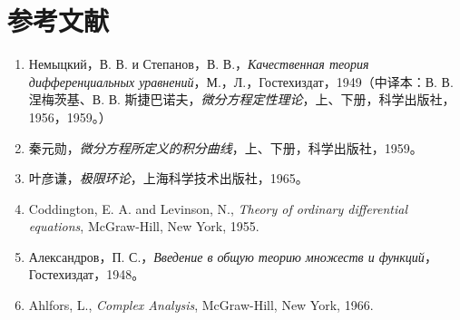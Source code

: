 \section*{参考文献}

\begin{enumerate}
\item Немыцкий，В. В. и Степанов，В. В.，\textit{Качественная теория дифференциальных уравнений}，М.，Л.，Гостехиздат，1949（中译本：В. В. 涅梅茨基、В. В. 斯捷巴诺夫，\textit{微分方程定性理论}，上、下册，科学出版社，1956，1959。）
\item 秦元勋，\textit{微分方程所定义的积分曲线}，上、下册，科学出版社，1959。
\item 叶彦谦，\textit{极限环论}，上海科学技术出版社，1965。
\item Coddington, E. A. and Levinson, N., \textit{Theory of ordinary differential equations}, McGraw-Hill, New York, 1955.
\item Александров，П. С.，\textit{Введение в общую теорию множеств и функций}，Гостехиздат，1948。
\item Ahlfors, L., \textit{Complex Analysis}, McGraw-Hill, New York, 1966.
\end{enumerate}


